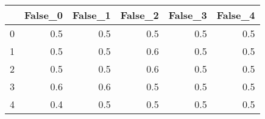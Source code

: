 \begin{tabular}{lrrrrr}
\toprule
{} &  False\_0 &  False\_1 &  False\_2 &  False\_3 &  False\_4 \\ \hline
\midrule
0 &      0.5 &      0.5 &      0.5 &      0.5 &      0.5 \\ \hline
1 &      0.5 &      0.5 &      0.6 &      0.5 &      0.5 \\ \hline
2 &      0.5 &      0.5 &      0.6 &      0.5 &      0.5 \\ \hline
3 &      0.6 &      0.6 &      0.5 &      0.5 &      0.5 \\ \hline
4 &      0.4 &      0.5 &      0.5 &      0.5 &      0.5 \\ \hline
\bottomrule
\end{tabular}

